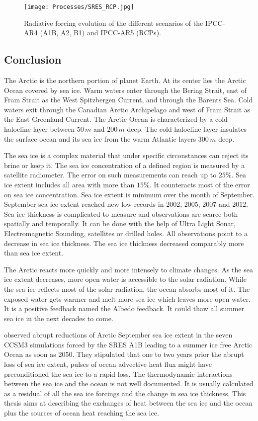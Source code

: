 \begin{figure}
\center
\texttt{[image: Processes/SRES\_RCP.jpg]}
\caption{Radiative forcing evolution of the different scenarios of the IPCC-AR4 (A1B, A2, B1) and IPCC-AR5 (RCPs).}
\label{SRES_RCP}
\end{figure}

\subsection{Conclusion}

The Arctic is the northern portion of planet Earth. At its center lies the Arctic Ocean covered by sea ice. Warm waters enter through the Bering Strait, east of Fram Strait as the West Spitzbergen Current, and through the Barents Sea. Cold waters exit through the Canadian Arctic Archipelago and west of Fram Strait  as the East Greenland Current. The Arctic Ocean is characterized by a cold halocline layer between $50\,m$ and $200\,m$ deep. The cold halocline layer insulates the surface ocean and its sea ice from the warm Atlantic layers $300\,m$ deep.

The sea ice is a complex material that under specific circonstances can reject its brine or keep it. The sea ice concentration of a defined region is measured by a satellite radiometer. The error on such measurements can reach up to $25\%$. Sea ice extent includes all area with more than $15\%$. It counteracts most of the error on sea ice concentration. Sea ice extent is minimum over the month of September. September sea ice extent reached new low records in 2002, 2005, 2007 and 2012. Sea ice thickness is complicated to measure and observations are scarce both spatially and temporally. It can be done with the help of Ultra Light Sonar, Electromagnetic Sounding, satellites or drilled holes. All observations point to a decrease in sea ice thickness. The sea ice thickness decreased comparably more than sea ice extent. 

The Arctic reacts more quickly and more intensely to climate changes. As the sea ice extent decreases, more open water is accessible to the solar radiation. While the sea ice reflects most of the solar radiation, the ocean absorbs most of it. The exposed water gets warmer and melt more sea ice which leaves more open water. It is a positive feedback named the Albedo feedback. It could thaw all summer sea ice in the next decades to come. 

\cite{ISI:000242942100008} observed abrupt reductions of Arctic September sea ice extent in the seven CCSM3 simulations forced by the SRES A1B leading to a summer ice free Arctic Ocean as soon as 2050. They stipulated that one to two years prior the abrupt loss of sea ice extent, pulses of ocean advective heat flux might have preconditioned the sea ice to a rapid loss. The thermodynamic interactions between the sea ice and the ocean is not well documented. It is usually calculated as a residual of all the sea ice forcings and the change in sea ice thickness. This thesis aims at describing the exchanges of heat between the sea ice and the ocean plus the sources of ocean heat reaching the sea ice. 

